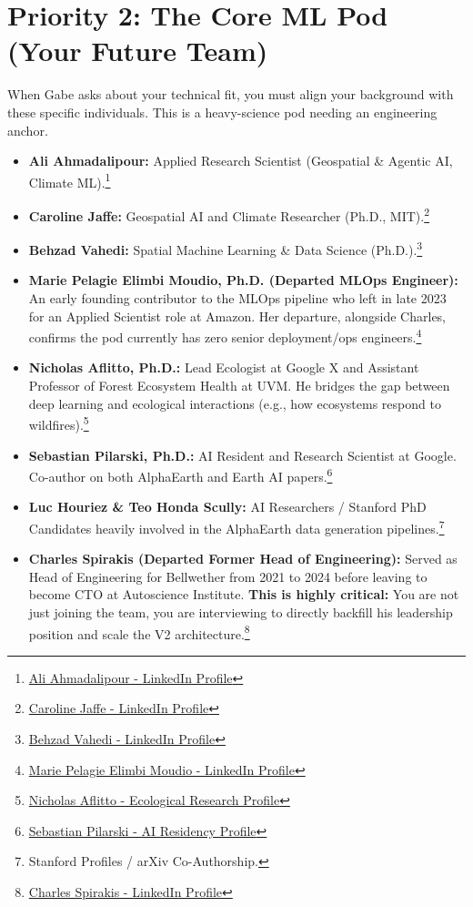 \documentclass[11pt]{article}
\begin{document}
\section{Priority 2: The Core ML Pod (Your Future Team)}
When Gabe asks about your technical fit, you must align your background with these specific individuals. This is a heavy-science pod needing an engineering anchor.
\begin{itemize}[leftmargin=*]
    \item \textbf{Ali Ahmadalipour:} Applied Research Scientist (Geospatial \& Agentic AI, Climate ML).\footnote{\href{https://www.linkedin.com/in/ahmadalipour/}{Ali Ahmadalipour - LinkedIn Profile}}
    \item \textbf{Caroline Jaffe:} Geospatial AI and Climate Researcher (Ph.D., MIT).\footnote{\href{https://www.linkedin.com/in/carolinejaffe/}{Caroline Jaffe - LinkedIn Profile}}
    \item \textbf{Behzad Vahedi:} Spatial Machine Learning \& Data Science (Ph.D.).\footnote{\href{https://www.linkedin.com/in/behzad-vahedi/}{Behzad Vahedi - LinkedIn Profile}}
    \item \textbf{Marie Pelagie Elimbi Moudio, Ph.D. (Departed MLOps Engineer):} An early founding contributor to the MLOps pipeline who left in late 2023 for an Applied Scientist role at Amazon. Her departure, alongside Charles, confirms the pod currently has zero senior deployment/ops engineers.\footnote{\href{https://www.linkedin.com/in/marie-pelagie-elimbi-moudio-481335105/}{Marie Pelagie Elimbi Moudio - LinkedIn Profile}}
    \item \textbf{Nicholas Aflitto, Ph.D.:} Lead Ecologist at Google X and Assistant Professor of Forest Ecosystem Health at UVM. He bridges the gap between deep learning and ecological interactions (e.g., how ecosystems respond to wildfires).\footnote{\href{https://nickaflitto.com/}{Nicholas Aflitto - Ecological Research Profile}}
    \item \textbf{Sebastian Pilarski, Ph.D.:} AI Resident and Research Scientist at Google. Co-author on both AlphaEarth and Earth AI papers.\footnote{\href{https://sebastianpilarski.com/}{Sebastian Pilarski - AI Residency Profile}}
    \item \textbf{Luc Houriez \& Teo Honda Scully:} AI Researchers / Stanford PhD Candidates heavily involved in the AlphaEarth data generation pipelines.\footnote{Stanford Profiles / arXiv Co-Authorship.}
    \item \textbf{Charles Spirakis (Departed Former Head of Engineering):} Served as Head of Engineering for Bellwether from 2021 to 2024 before leaving to become CTO at Autoscience Institute. \textbf{This is highly critical:} You are not just joining the team, you are interviewing to directly backfill his leadership position and scale the V2 architecture.\footnote{\href{https://www.linkedin.com/in/charles-spirakis/}{Charles Spirakis - LinkedIn Profile}}
\end{itemize}
\end{document}
